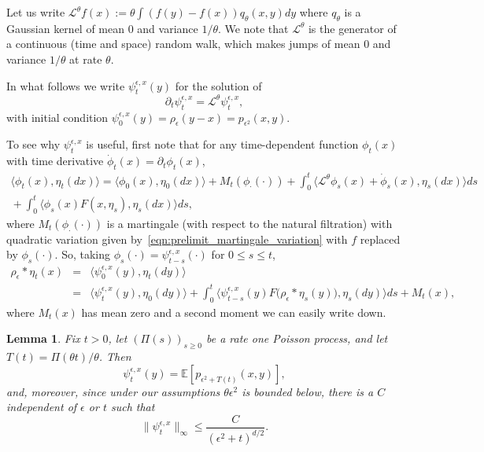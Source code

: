 \documentclass[12pt]{article}
\newtheorem{lemma}[theorem]{Lemma}
\newcommand{\IE}{\mathbb E}
\numberwithin{equation}{section}
\begin{document}
Let us write $\mathcal{L}^\theta f(x) := \theta \int (f(y)-f(x))q_\theta(x,y) dy$ 
where $q_\theta$ is a Gaussian kernel of mean $0$ and variance $1/\theta$. 
We note that $\mathcal{L}^\theta$ is the generator of a continuous (time and 
space) random walk, which makes jumps of mean $0$ and variance $1/\theta$ at
rate $\theta$.

In what follows we write $\psi_t^{\epsilon, x}(y)$ for the solution of
\begin{equation}
    \partial_t \psi_t^{\epsilon,x}
    =
    \mathcal{L}^\theta \psi_t^{\epsilon, x},
    \label{AlmostHeatEquation}
\end{equation}
with initial condition 
$\psi_0^{\epsilon,x}(y) = \rho_\epsilon(y-x) =p_{\epsilon^2}(x,y)$.

To see why $\psi_t^{\epsilon,x}$ is useful,
first note that for any time-dependent function $\phi_t(x)$
with time derivative $\dot \phi_t(x) = \partial_t \phi_t(x)$,
\begin{multline}
\label{time dep mg prob}
    \langle \phi_t(x), \eta_t(dx) \rangle
    = 
    \langle \phi_0(x), \eta_0(dx) \rangle
    +
    M_t(\phi_\cdot(\cdot))
    +
    \int_0^t \big\langle \mathcal{L}^\theta \phi_s(x) 
        + \dot \phi_s(x), \eta_s(dx) \big\rangle ds
    \\  {}
    +
    \int_{0}^t \big\langle \phi_s(x) F(x, \eta_s) , \eta_s(dx) \big\rangle ds ,
\end{multline}
where $M_t(\phi_\cdot(\cdot))$ is a martingale (with respect to the natural filtration)
with quadratic variation given by~\eqref{eqn:prelimit_martingale_variation}
with $f$ replaced by $\phi_s(\cdot)$.
So, taking $\phi_s(\cdot)=\psi_{t-s}^{\epsilon,x}(\cdot)$ for $0 \le s \le t$,
\begin{eqnarray}
    \nonumber
    \rho_\epsilon*\eta_t(x)&=&\langle\psi^{\epsilon,x}_0(y),\eta_t(dy)\rangle
    \\
    &=&\langle\psi^{\epsilon,x}_t(y),\eta_0(dy)\rangle
    +\int_0^t\big\langle\psi^{\epsilon,x}_{t-s}(y)
    F\big(\rho_\epsilon*\eta_s(y)\big), \eta_s(dy)\big\rangle ds
    +M_t(x),
    \label{expn rhoepsilon} 
\end{eqnarray}
where $M_t(x)$ has mean zero and a second moment we can easily write down.


\begin{lemma} \label{PsiBoundHS}
    Fix $t>0$,
    let $(\Pi(s))_{s \ge 0}$ be a rate one Poisson process,
    and let $T(t) = \Pi(\theta t) / \theta$.
    Then
    \[
        \psi^{\epsilon,x}_t(y)
        =
        \IE\left[ p_{\epsilon^2+T(t)}(x,y)\right],
    \]
    and, moreover,
    since under our assumptions $\theta \epsilon^2$ is bounded below,
    there is a $C$ independent of $\epsilon$ or $t$ such that
    \[
        \| \psi^{\epsilon,x}_t \|_\infty
        \leq
        \frac{C}{(\epsilon^2 + t)^{d/2}} .
    \]
\end{lemma}
\end{document}
